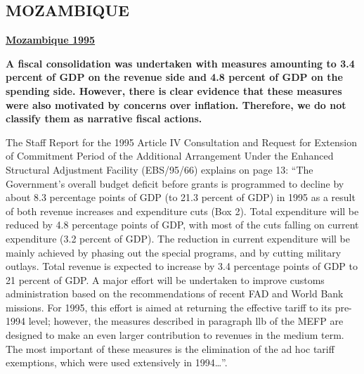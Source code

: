 \subsection[MOZAMBIQUE]{MOZAMBIQUE\protect\footnotemark}

\textbf{\underline{Mozambique 1995}}

\textbf{A fiscal consolidation was undertaken with measures amounting to 3.4 percent of GDP on the revenue side and 4.8 percent of GDP on the spending side. However, there is clear evidence that these measures were also motivated by concerns over inflation. Therefore, we do not classify them as narrative fiscal actions.}

The Staff Report for the 1995 Article IV Consultation and Request for Extension of Commitment Period of the Additional Arrangement Under the Enhanced Structural Adjustment Facility (EBS/95/66) explains on page 13: “The Government's overall budget deficit before grants is programmed to decline by about 8.3 percentage points of GDP (to 21.3 percent of GDP) in 1995 as a result of both revenue increases and expenditure cuts (Box 2). Total expenditure will be reduced by 4.8 percentage points of GDP, with most of the cuts falling on current expenditure (3.2 percent of GDP). The reduction in current expenditure will be mainly achieved by phasing out the special programs, and by cutting military outlays. 
Total revenue is expected to increase by 3.4 percentage points of GDP to 21 percent of GDP. A major effort will be undertaken to improve customs administration based on the recommendations of recent FAD and World Bank missions. For 1995, this effort is aimed at returning the effective tariff to its pre-1994 level; however, the measures described in paragraph llb of the MEFP are designed to make an even larger contribution to revenues in the medium term. The most important of these measures is the elimination of the ad hoc tariff exemptions, which were used extensively in 1994…”.

